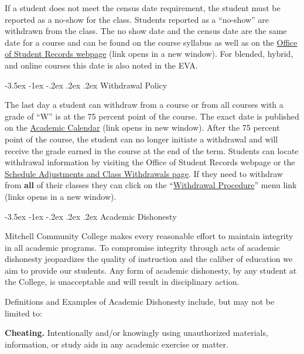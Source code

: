 \documentclass{article}
\makeatletter
\renewcommand\section{\@startsection{section}{1}{0pt}%
  {-3.5ex \@plus -1ex \@minus -.2ex}%
  {.2ex \@plus.2ex}%
  {\normalfont\Large\bfseries}} %
\makeatother
\begin{document}
If a student does not meet the census date requirement, the student must be reported as a no-show for the class. Students reported as a ``no-show'' are withdrawn from the class.  The no show date and the census date are the same date for a course and can be found on the course syllabus as well as on the \href{https://mitchellcc.edu/office-student-records}{Office of Student Records webpage} (link opens in a new window). For blended, hybrid, and online courses this date is also noted in the EVA.

\section{Withdrawal Policy}

The last day a student can withdraw from a course or from all courses with a grade of ``W'' is at the 75 percent point of the course. The exact date is published on the \href{https://www.mitchellcc.edu/wp-content/uploads/2024/05/2024-2025-Academic-Calendar.pdf}{Academic Calendar} (link opens in new window). After the 75 percent point of the course, the student can no longer initiate a withdrawal and will receive the grade earned in the course at the end of the term. Students can locate withdrawal information by visiting the Office of Student Records webpage or the \href{https://www.mitchellcc.edu/schedule-adjustments-and-class-withdrawals/}{Schedule Adjustments and Class Withdrawals page}. If they need to withdraw from \textbf{all} of their classes they can click on the ``\href{https://mitchellcc.edu/withdrawal-procedure}{Withdrawal Procedure}'' menu link (links opens in a new window).

\section{Academic Dishonesty}

Mitchell Community College makes every reasonable effort to maintain integrity in all academic programs. To compromise integrity through acts of academic dishonesty jeopardizes the quality of instruction and the caliber of education we aim to provide our students.  Any form of academic dishonesty, by any student at the College, is unacceptable and will result in disciplinary action.

Definitions and Examples of Academic Dishonesty include, but may not be limited to:

\textbf{Cheating.} Intentionally and/or knowingly using unauthorized materials, information, or study aids in any academic exercise or matter.
\end{document}
